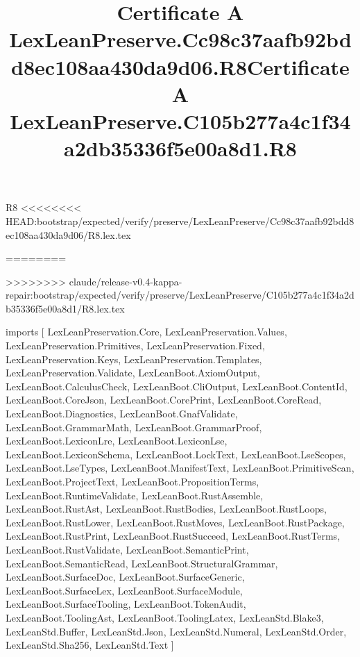 \begin{lexlean}{R8}
<<<<<<<< HEAD:bootstrap/expected/verify/preserve/LexLeanPreserve/Cc98c37aafb92bdd8ec108aa430da9d06/R8.lex.tex
\title{Certificate A LexLeanPreserve.Cc98c37aafb92bdd8ec108aa430da9d06.R8}
========
\title{Certificate A LexLeanPreserve.C105b277a4c1f34a2db35336f5e00a8d1.R8}
>>>>>>>> claude/release-v0.4-kappa-repair:bootstrap/expected/verify/preserve/LexLeanPreserve/C105b277a4c1f34a2db35336f5e00a8d1/R8.lex.tex
\begin{coremodule}
imports [
  LexLeanPreservation.Core,
  LexLeanPreservation.Values,
  LexLeanPreservation.Primitives,
  LexLeanPreservation.Fixed,
  LexLeanPreservation.Keys,
  LexLeanPreservation.Templates,
  LexLeanPreservation.Validate,
  LexLeanBoot.AxiomOutput,
  LexLeanBoot.CalculusCheck,
  LexLeanBoot.CliOutput,
  LexLeanBoot.ContentId,
  LexLeanBoot.CoreJson,
  LexLeanBoot.CorePrint,
  LexLeanBoot.CoreRead,
  LexLeanBoot.Diagnostics,
  LexLeanBoot.GnafValidate,
  LexLeanBoot.GrammarMath,
  LexLeanBoot.GrammarProof,
  LexLeanBoot.LexiconLre,
  LexLeanBoot.LexiconLse,
  LexLeanBoot.LexiconSchema,
  LexLeanBoot.LockText,
  LexLeanBoot.LseScopes,
  LexLeanBoot.LseTypes,
  LexLeanBoot.ManifestText,
  LexLeanBoot.PrimitiveScan,
  LexLeanBoot.ProjectText,
  LexLeanBoot.PropositionTerms,
  LexLeanBoot.RuntimeValidate,
  LexLeanBoot.RustAssemble,
  LexLeanBoot.RustAst,
  LexLeanBoot.RustBodies,
  LexLeanBoot.RustLoops,
  LexLeanBoot.RustLower,
  LexLeanBoot.RustMoves,
  LexLeanBoot.RustPackage,
  LexLeanBoot.RustPrint,
  LexLeanBoot.RustSucceed,
  LexLeanBoot.RustTerms,
  LexLeanBoot.RustValidate,
  LexLeanBoot.SemanticPrint,
  LexLeanBoot.SemanticRead,
  LexLeanBoot.StructuralGrammar,
  LexLeanBoot.SurfaceDoc,
  LexLeanBoot.SurfaceGeneric,
  LexLeanBoot.SurfaceLex,
  LexLeanBoot.SurfaceModule,
  LexLeanBoot.SurfaceTooling,
  LexLeanBoot.TokenAudit,
  LexLeanBoot.ToolingAst,
  LexLeanBoot.ToolingLatex,
  LexLeanStd.Blake3,
  LexLeanStd.Buffer,
  LexLeanStd.Json,
  LexLeanStd.Numeral,
  LexLeanStd.Order,
  LexLeanStd.Sha256,
  LexLeanStd.Text
]


\end{coremodule}
\end{lexlean}
